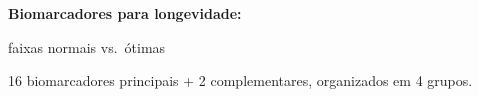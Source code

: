 \begingroup
\sffamily\footnotesize
\setlength{\tabcolsep}{4pt}
\renewcommand{\arraystretch}{1.20}

\begin{center}
{\sffamily\bfseries\color{petrol}\large%
Biomarcadores para longevidade:\par
faixas normais vs.\ ótimas\par}
\smallskip
{\sffamily\scriptsize\color{ink}%
16 biomarcadores principais + 2 complementares, organizados em 4 grupos.\par}
\end{center}
\smallskip

